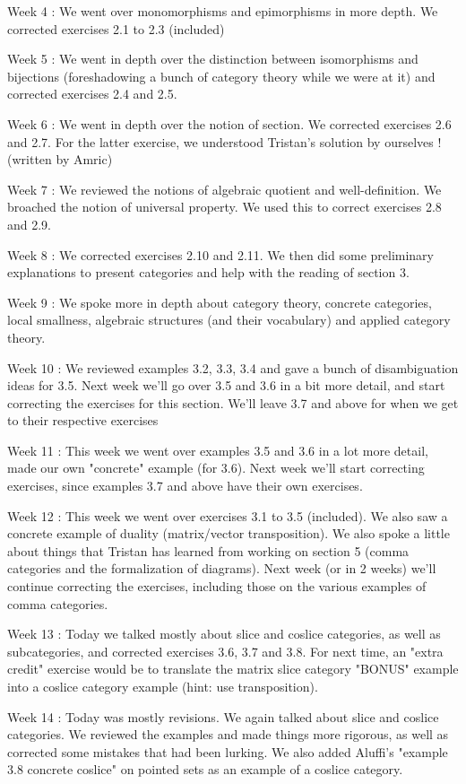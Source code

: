 Week 4 : We went over monomorphisms and epimorphisms in more depth. We corrected exercises 2.1 to 2.3 (included)

Week 5 : We went in depth over the distinction between isomorphisms and bijections (foreshadowing a bunch of category theory while we were at it) and corrected exercises 2.4 and 2.5.

Week 6 : We went in depth over the notion of section. We corrected exercises 2.6 and 2.7. For the latter exercise, we understood Tristan's solution by ourselves ! (written by Amric)

Week 7 : We reviewed the notions of algebraic quotient and well-definition. We broached the notion of universal property. We used this to correct exercises 2.8 and 2.9.

Week 8 : We corrected exercises 2.10 and 2.11. We then did some preliminary explanations to present categories and help with the reading of section 3.

Week 9 : We spoke more in depth about category theory, concrete categories, local smallness, algebraic structures (and their vocabulary) and applied category theory.

Week 10 : We reviewed examples 3.2, 3.3, 3.4 and gave a bunch of disambiguation ideas for 3.5. Next week we'll go over 3.5 and 3.6 in a bit more detail, and start correcting the exercises for this section. We'll leave 3.7 and above for when we get to their respective exercises

Week 11 : This week we went over examples 3.5 and 3.6 in a lot more detail, made our own "concrete" example (for 3.6). Next week we'll start correcting exercises, since examples 3.7 and above have their own exercises. 

Week 12 : This week we went over exercises 3.1 to 3.5 (included). We also saw a concrete example of duality (matrix/vector transposition). We also spoke a little about things that Tristan has learned from working on section 5 (comma categories and the formalization of diagrams). Next week (or in 2 weeks) we'll continue correcting the exercises, including those on the various examples of comma categories.

Week 13 : Today we talked mostly about slice and coslice categories, as well as subcategories, and corrected exercises 3.6, 3.7 and 3.8.
For next time, an "extra credit" exercise would be to translate the matrix slice category "BONUS" example into a coslice category example (hint: use transposition).

Week 14 : Today was mostly revisions. We again talked about slice and coslice categories. We reviewed the examples and made things more rigorous, as well as corrected some mistakes that had been lurking. We also added Aluffi's "example 3.8 concrete coslice" on pointed sets as an example of a coslice category.

